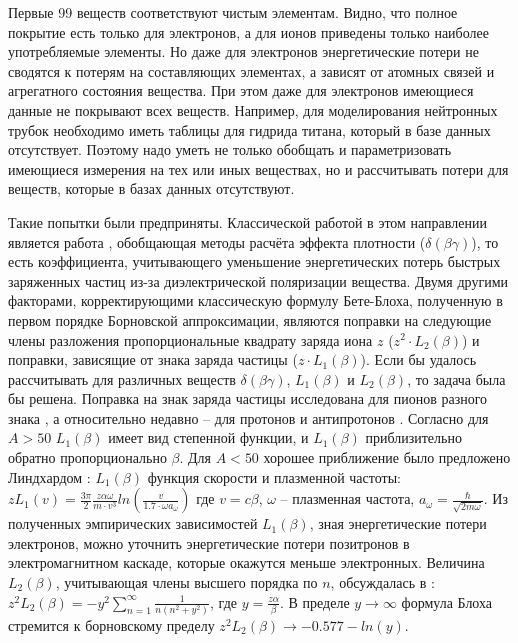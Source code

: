\documentclass[a4paper,12pt]{article}
\begin{document}
\begin{large}
    Первые 99 веществ соответствуют чистым элементам.
    Видно, что полное покрытие есть только для электронов, а для ионов приведены только наиболее употребляемые элементы.
    Но даже для электронов энергетические потери не сводятся к потерям на составляющих элементах, а зависят от атомных связей и агрегатного состояния вещества.
    При этом даже для электронов имеющиеся данные не покрывают всех веществ.
    Например, для моделирования нейтронных трубок необходимо иметь таблицы для гидрида титана, который в базе данных отсутствует.
    Поэтому надо уметь не только обобщать и параметризовать имеющиеся измерения на тех или иных веществах, но и рассчитывать потери для веществ, которые в базах данных отсутствуют.
    
    Такие попытки были предприняты.
    Классической работой в этом направлении является работа \cite{TeorDEDX}, обобщающая методы расчёта эффекта плотности ($\delta(\beta\gamma)$), то есть коэффициента, учитывающего уменьшение энергетических потерь быстрых заряженных частиц из-за диэлектрической поляризации вещества.
    Двумя другими факторами, корректирующими классическую формулу Бете-Блоха, полученную в первом порядке Борновской аппроксимации, являются поправки на следующие члены разложения пропорциональные квадрату заряда иона $z$ ($z^2\cdot L_2(\beta)$) и поправки, зависящие от знака заряда частицы ($z\cdot L_1(\beta)$).
    Если бы удалось рассчитывать для различных веществ $\delta(\beta\gamma)$, $L_1(\beta)$ и $L_2(\beta)$, то задача была бы решена.
    Поправка на знак заряда частицы исследована для пионов разного знака \cite{pipmDEDX}, а относительно недавно -- для протонов и антипротонов \cite{papDEDX}.
    Согласно \cite{Bichsel90} для $A>50$ $L_1(\beta)$ имеет вид степенной функции, и $L_1(\beta)$ приблизительно обратно пропорционально $\beta$. Для $A<50$ хорошее приближение было предложено Линдхардом \cite{LindhardBarkas76}:  $L_1(\beta)$ функция скорости и плазменной частоты: $zL_1(v)=\frac{3\pi}{2}\frac{z\alpha\omega}{m\cdot v^3}ln(\frac{v}{1.7\cdot\omega a_\omega})$ где $v=c\beta$, $\omega$ -- плазменная частота, $a_\omega=\frac{\hbar}{\sqrt{2m\omega}}$.
    Из полученных эмпирических зависимостей $L_1(\beta)$, зная энергетические потери электронов, можно уточнить энергетические потери позитронов в электромагнитном каскаде, которые окажутся меньше электронных.
    Величина $L_2(\beta)$, учитывающая члены высшего порядка по $n$, обсуждалась в \cite{DEDXICRU49}: $z^2L_2(\beta)= -y^2\sum_{n=1}^\infty\frac{1}{n(n^2+y^2)}$, где $y=\frac{z\alpha}{\beta}$.
    В пределе $y\rightarrow\infty$ формула Блоха стремится к борновскому пределу $z^2L_2(\beta)\rightarrow -0.577-ln(y)$.
    

\end{large}
\end{document}
